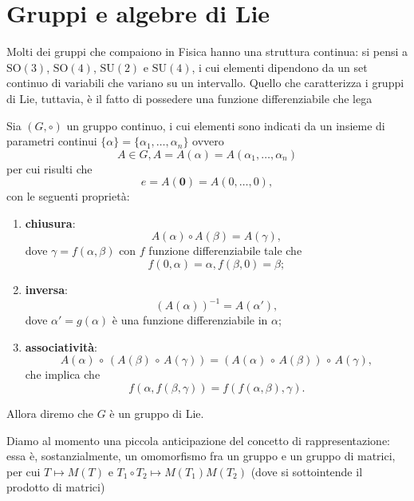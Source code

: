 \chapter{Gruppi e algebre di Lie}

Molti dei gruppi che compaiono in Fisica hanno una struttura continua: si pensi a $\text{SO}(3)$, $\text{SO}(4)$, $\text{SU}(2)$ e $\text{SU}(4)$, i cui
elementi dipendono da un set continuo di variabili che variano su un intervallo. Quello che caratterizza i gruppi di Lie, tuttavia, è il fatto di possedere una funzione
differenziabile che lega 
\begin{definition}
    Sia $(G, \circ)$ un gruppo continuo, i cui elementi sono indicati da un insieme di parametri continui $\{ \alpha \} = \{ \alpha_1, \ldots, \alpha_n \}$ ovvero
    \begin{equation}
        A \in G, A = A(\alpha) = A(\alpha_1, \ldots, \alpha_n)
    \end{equation}
    per cui risulti che
    \begin{equation}
        e = A(\mathbf{0}) = A(0, \ldots, 0),
    \end{equation}
    con le seguenti proprietà:
    \begin{enumerate}[label=\protect\circled{\arabic*}]
        \item \textbf{chiusura}:
        \begin{equation}
            A(\alpha) \circ A(\beta) = A(\gamma),
        \end{equation}
        dove $\gamma = f(\alpha, \beta)$ con $f$ funzione differenziabile tale che
        \begin{equation}
            f(0, \alpha) = \alpha, f(\beta, 0) = \beta;
        \end{equation}
        \item \textbf{inversa}:
        \begin{equation}
            (A(\alpha))^{-1} = A(\alpha'),
        \end{equation}
        dove $\alpha' = g(\alpha)$ è una funzione differenziabile in $\alpha$;
        \item \textbf{associatività}:
        \begin{equation}
            A(\alpha) \, \circ \, (A(\beta) \, \circ \, A(\gamma)) = (A(\alpha) \, \circ \, A(\beta)) \, \circ \, A(\gamma),
        \end{equation}
        che implica che
        \begin{equation}
            f(\alpha, f(\beta, \gamma)) = f(f(\alpha, \beta), \gamma).
        \end{equation}
    \end{enumerate}
    Allora diremo che $G$ è un gruppo di Lie.
\end{definition}
Diamo al momento una piccola anticipazione del concetto di rappresentazione: essa è, sostanzialmente, un omomorfismo fra un gruppo e un gruppo di matrici, per cui $T \mapsto M(T)$ e $T_1 \circ T_2 \mapsto M(T_1) M(T_2)$ (dove si sottointende
il prodotto di matrici)

